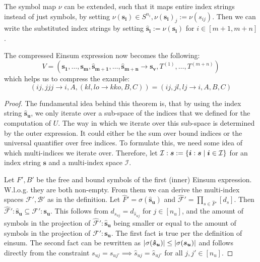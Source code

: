 \begin{theorem}
    The symbol map $\nu$ can be extended, such that it maps entire index strings instead of just symbols, by setting $\nu(\bm{s_i}) \in S^{n_i}, \nu(\bm{s_i})_j := \nu(s_{ij})$.
    Then we can write the substituted index strings by setting $\bm{\hat{s}_i} := \nu(\bm{s_i})$ for $i \in [m + 1, m + n]$.

    The compressed Einsum expression now becomes the following:
    $$V = (\bm{s_1},\dots,\bm{s_m}, \bm{\hat{s}_{m + 1}}, \dots, \bm{\hat{s}_{m + n}} \rightarrow \bm{s_v}, T^{(1)},\dots,T^{(m + n)})$$
    which helps us to compress the example:
    $$(ij, jjj \rightarrow i, A, (kl, lo \rightarrow kko, B, C)) = (ij, jl, lj \rightarrow i, A, B, C)$$
\end{theorem}

\begin{proof}
    \small
    The fundamental idea behind this theorem is, that by using the index string $\bm{\hat{s}_u}$, we only iterate over a sub-space of the indices that we defined for the computation of $U$.
    The way in which we iterate over this sub-space is determined by the outer expression.
    It could either be the sum over bound indices or the universal quantifier over free indices.
    To formulate this, we need some idea of which multi-indices we iterate over.
    Therefore, let $\mathcal{I}:\bm{s} := \lbrace \bm{i}: \bm{s} \mid \bm{i} \in \mathcal{I} \rbrace$ for an index string $\bm{s}$ and a multi-index space $\mathcal{I}$.

    Let $F', B'$ be the free and bound symbols of the first (inner) Einsum expression.
    W.l.o.g. they are both non-empty.
    From them we can derive the multi-index spaces $\mathcal{F}', \mathcal{B}'$ as in the definition.
    Let $\hat{F}' = \sigma(\bm{\hat{s}_u})$ and $\mathcal{\hat{F}}' = \prod_{s \in \hat{F}'} [d_s]$.
    Then $\mathcal{\hat{F}}':\bm{\hat{s}_u} \subseteq \mathcal{F}':\bm{s_u}$.
    This follows from $d_{s_{uj}} = d_{\hat{s}_{uj}}$ for $j \in [n_u]$,
    and the amount of symbols in the projection of $\mathcal{\hat{F}}':\bm{\hat{s}_u}$ being smaller or equal to the amount of symbols in the projection of $\mathcal{F}':\bm{s_u}$.
    The first fact is true per the definition of einsum.
    The second fact can be rewritten as $\left| \sigma(\bm{\hat{s}_u}) \right| \leq \left| \sigma(\bm{s_u}) \right|$ and follows directly from the constraint $s_{uj} = s_{uj'} \implies \hat{s}_{uj} = \hat{s}_{uj'}$ for all $j,j' \in [n_u]$.


\end{proof}
